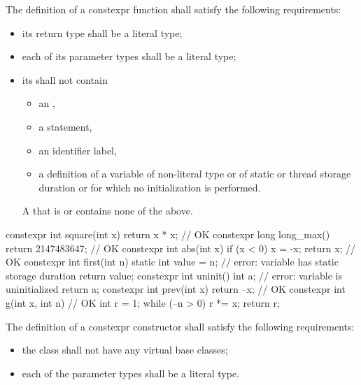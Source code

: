 \pnum
{}
The definition of a constexpr function shall satisfy the following
requirements:

\begin{itemize}
\item
its return type shall be a literal type;

\item
each of its parameter types shall be a literal type;

\item
its  shall not contain
\begin{itemize}
\item an ,
\item a  statement,
\item an identifier label,
\item a definition of a variable
of non-literal type or
of static or thread storage duration or
for which no initialization is performed.
\end{itemize}
\begin{note}
A  that is  or 
contains none of the above.
\end{note}
\end{itemize}

\begin{example}
\begin{codeblock}
constexpr int square(int x)
  { return x * x; }             // OK
constexpr long long_max()
  { return 2147483647; }        // OK
constexpr int abs(int x) {
  if (x < 0)
    x = -x;
  return x;                     // OK
}
constexpr int first(int n) {
  static int value = n;         // error: variable has static storage duration
  return value;
}
constexpr int uninit() {
  int a;                        // error: variable is uninitialized
  return a;
}
constexpr int prev(int x)
  { return --x; }               // OK
constexpr int g(int x, int n) { // OK
  int r = 1;
  while (--n > 0) r *= x;
  return r;
}
\end{codeblock}
\end{example}

\pnum
{}%
The definition of a constexpr constructor shall satisfy the
following requirements:
\begin{itemize}
\item
the class shall not have any virtual base classes;

\item
each of the parameter types shall be a literal type.
\end{itemize}

